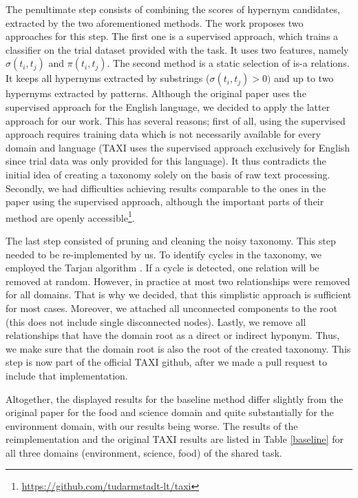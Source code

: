 \documentclass[12pt, headsepline, a4paper]{scrartcl}
\begin{document}
The penultimate step consists of combining the scores of hypernym candidates, extracted by the two aforementioned methods. The work proposes two approaches for this step. The first one is a supervised approach, which trains a classifier on the trial dataset provided with the task. It uses two features, namely $\sigma(t_i, t_j)$ and $\pi(t_i, t_j)$. The second method is a static selection of is-a relations. It keeps all hypernyms extracted by substrings ($\sigma(t_i, t_j) > 0)$ and up to two hypernyms extracted by patterns. Although the original paper uses the supervised approach for the English language, we decided to apply the latter approach for our work. This has several reasons; first of all, using the supervised approach requires training data which is not necessarily available for every domain and language (TAXI uses the supervised approach exclusively for English since trial data was only provided for this language). It thus contradicts the initial idea of creating a taxonomy solely on the basis of raw text processing. Secondly, we had difficulties achieving results comparable to the ones in the paper using the supervised approach, although the important parts of their method are openly accessible\footnote{\url{https://github.com/tudarmstadt-lt/taxi}}.


The last step consisted of pruning and cleaning the noisy taxonomy. This step needed to be re-implemented by us. To identify cycles in the taxonomy, we employed the Tarjan algorithm \citep{tarjan1972depth}. If a cycle is detected, one relation will be removed at random. However, in practice at most two relationships were removed for all domains. That is why we decided, that this simplistic approach is sufficient for most cases. Moreover, we attached all unconnected components to the root (this does not include single disconnected nodes). Lastly, we remove all relationships that have the domain root as a direct or indirect hyponym. Thus, we make sure that the domain root is also the root of the created taxonomy. This step is now part of the official TAXI github, after we made a pull request to include that implementation.

Altogether, the displayed results for the baseline method differ slightly from the original paper for the food and science domain and quite substantially for the environment domain, with our results being worse. The results of the reimplementation and the original TAXI results are listed in Table \ref{baseline} for all three domains (environment, science, food) of the shared task.
\end{document}
